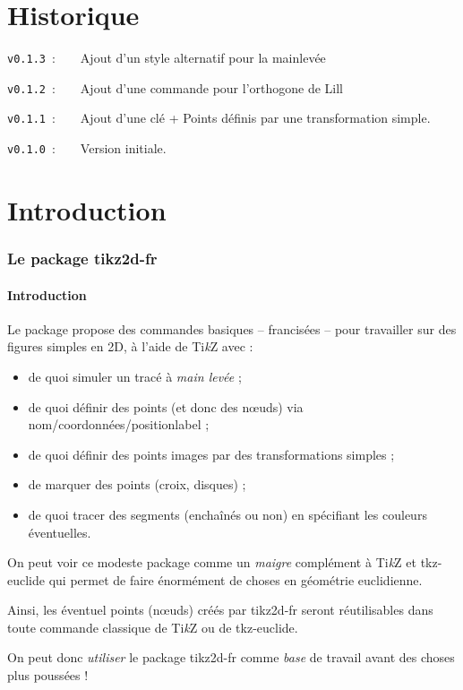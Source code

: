 \documentclass[french,a4paper,11pt]{article}
\providecommand\tikzlogo{Ti\textit{k}Z}
\let\TikZ\tikzlogo
\newcommand\Cle[1]{{\bfseries\sffamily\textlangle #1\textrangle}}
\newcommand\cmaj[1]{\tcbox[vignetteMaJ]{#1}\xspace}
\begin{document}
\vfill

\part{Historique}

\verb|v0.1.3|~:~~~~Ajout d'un style alternatif pour la mainlevée

\verb|v0.1.2|~:~~~~Ajout d'une commande pour l'orthogone de Lill

\verb|v0.1.1|~:~~~~Ajout d'une clé \Cle{[TaillePolice]} + Points définis par une transformation simple.

\verb|v0.1.0|~:~~~~Version initiale.

\newpage

\part{Introduction}

\section{Le package tikz2d-fr}

\subsection{Introduction}

\begin{noteblock}
Le package propose des commandes basiques -- francisées -- pour travailler sur des figures simples en 2D, à l'aide de \TikZ{} avec :

\begin{itemize}
	\item de quoi simuler un tracé à \textit{main levée} ;
	\item de quoi définir des points (et donc des nœuds) via \textsf{nom/coordonnées/positionlabel} ;
	\item \cmaj{0.1.1} de quoi définir des points images par des transformations simples ;
	\item de marquer des points (croix, disques) ;
	\item de quoi tracer des segments (enchaînés ou non) en spécifiant les couleurs éventuelles.
\end{itemize}
\vspace*{-\baselineskip}\leavevmode
\end{noteblock}

\begin{importantblock}
On peut voir ce modeste package comme un \textit{maigre} complément à \TikZ{} et \textsf{tkz-euclide}\footnotemark{} qui permet de faire énormément de choses en géométrie euclidienne.

\smallskip

Ainsi, les éventuel points (nœuds) créés par \textsf{tikz2d-fr} seront réutilisables dans toute commande classique de \TikZ{} ou de \textsf{tkz-euclide}.

\smallskip

On peut donc \textit{utiliser} le package \textsf{tikz2d-fr} comme \textit{base} de travail avant des choses plus poussées !
\end{importantblock}
\end{document}
